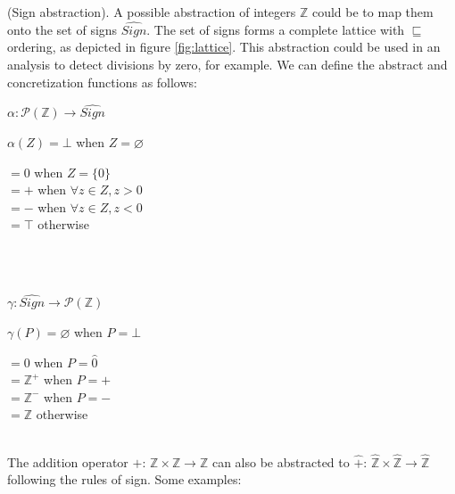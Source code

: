 \begin{exmp} 
\label{ex:signAbs}
(Sign abstraction). A possible abstraction of integers $\mathbb{Z}$ could be to map them onto the set of signs $\widehat{Sign}$. The set of signs forms a complete lattice with $\sqsubseteq$ ordering, as depicted in figure \ref{fig:lattice}. This abstraction could be used in an analysis to detect divisions by zero, for example. We can define the abstract and concretization functions as follows:\\


\centerline{$\alpha:\mathcal{P}(\mathbb{Z}) \rightarrow \widehat{Sign}$}
\centerline{$\alpha(Z) = \bot$ when $Z = \varnothing$}
\begin{addmargin}[5.84cm]{1em}%
$= 0$ when $Z = \{0\}$\\
$= +$ when $\forall z \in Z, z > 0$\\
$= -$ when $\forall z \in Z, z < 0$\\
$= \top$ otherwise
\end{addmargin}
\leavevmode \\\\
\centerline{$\gamma:\widehat{Sign} \rightarrow \mathcal{P}(\mathbb{Z})$}
\centerline{$\gamma(P) = \varnothing$ when $P = \bot$}
\begin{addmargin}[5.84cm]{1em}%
$= {0}$ when $P = \hat{0}$\\
$= \mathbb{Z}^+$ when $P = +$\\
$= \mathbb{Z}^-$ when $P = -$\\
$= \mathbb{Z}$ otherwise\\
\end{addmargin}
\leavevmode \\
The addition operator $+$: $\mathbb{Z}\times\mathbb{Z}\rightarrow\mathbb{Z}$ can also be abstracted to $\hat{+}$: $\hat{\mathbb{Z}}\times\hat{\mathbb{Z}}\rightarrow\hat{\mathbb{Z}}$ following the rules of sign. Some examples:\\



\end{exmp}
